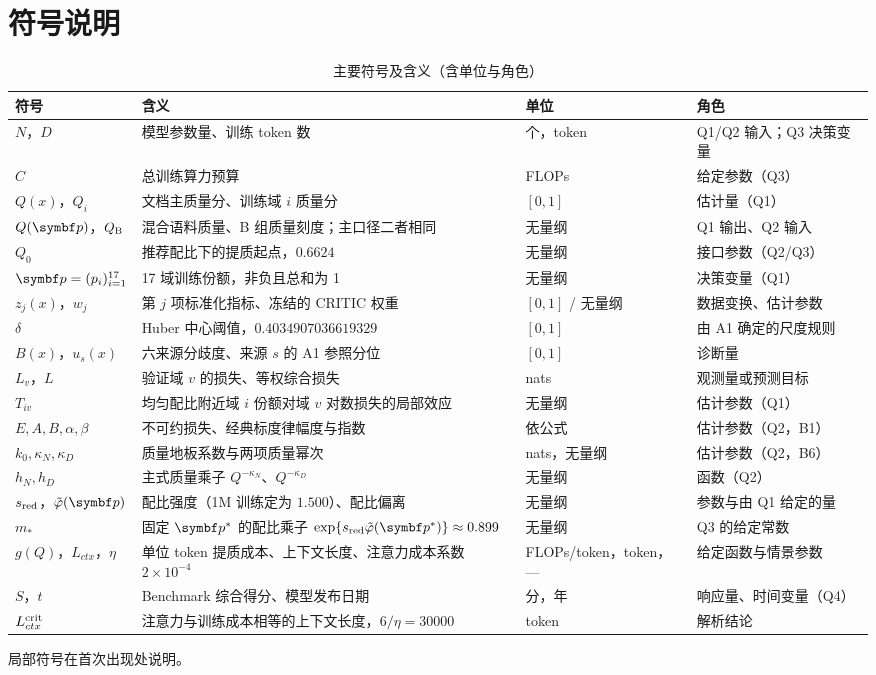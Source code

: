 \section{符号说明}
\label{sec:4}

\begin{table}[H]
\centering\footnotesize
\caption{主要符号及含义（含单位与角色）}
\label{tab:symbol}
\begin{tabularx}{\textwidth}{@{}p{2.5cm}X p{1.8cm}p{2.5cm}@{}}
\toprule
符号 & 含义 & 单位 & 角色 \\
\midrule
$N$，$D$ & 模型参数量、训练 token 数 & 个，token & Q1/Q2 输入；Q3 决策变量 \\
$C$ & 总训练算力预算 & FLOPs & 给定参数（Q3） \\
$Q(x)$，$Q_i$ & 文档主质量分、训练域 $i$ 质量分 & $[0,1]$ & 估计量（Q1） \\
$Q(\bp)$，$Q_{\rm B}$ & 混合语料质量、B 组质量刻度；主口径二者相同 & 无量纲 & Q1 输出、Q2 输入 \\
$Q_0$ & 推荐配比下的提质起点，$0.6624$ & 无量纲 & 接口参数（Q2/Q3） \\
$\bp=(p_i)_{i=1}^{17}$ & 17 域训练份额，非负且总和为 1 & 无量纲 & 决策变量（Q1） \\
$z_j(x)$，$w_j$ & 第 $j$ 项标准化指标、冻结的 CRITIC 权重 & $[0,1]$ / 无量纲 & 数据变换、估计参数 \\
$\delta$ & Huber 中心阈值，$0.4034907036619329$ & $[0,1]$ & 由 A1 确定的尺度规则 \\
$B(x)$，$u_s(x)$ & 六来源分歧度、来源 $s$ 的 A1 参照分位 & $[0,1]$ & 诊断量 \\
$L_v$，$L$ & 验证域 $v$ 的损失、等权综合损失 & nats & 观测量或预测目标 \\
$T_{iv}$ & 均匀配比附近域 $i$ 份额对域 $v$ 对数损失的局部效应 & 无量纲 & 估计参数（Q1） \\
$E,A,B,\alpha,\beta$ & 不可约损失、经典标度律幅度与指数 & 依公式 & 估计参数（Q2，B1） \\
$k_0,\kappa_N,\kappa_D$ & 质量地板系数与两项质量幂次 & nats，无量纲 & 估计参数（Q2，B6） \\
$h_N,h_D$ & 主式质量乘子 $Q^{-\kappa_N}$、$Q^{-\kappa_D}$ & 无量纲 & 函数（Q2） \\
$s_{\rm red}$，$\tilde\varphi(\bp)$ & 配比强度（1M 训练定为 $1.500$）、配比偏离 & 无量纲 & 参数与由 Q1 给定的量 \\
$m_*$ & 固定 $\bp^*$ 的配比乘子 $\exp\{s_{\rm red}\tilde\varphi(\bp^*)\}\approx0.899$ & 无量纲 & Q3 的给定常数 \\
$g(Q)$，$L_{ctx}$，$\eta$ & 单位 token 提质成本、上下文长度、注意力成本系数 $2\times10^{-4}$ & FLOPs/token，token，— & 给定函数与情景参数 \\
$S$，$t$ & Benchmark 综合得分、模型发布日期 & 分，年 & 响应量、时间变量（Q4） \\
$L_{ctx}^{\rm crit}$ & 注意力与训练成本相等的上下文长度，$6/\eta=30000$ & token & 解析结论 \\
\bottomrule
\end{tabularx}
\end{table}

局部符号在首次出现处说明。
